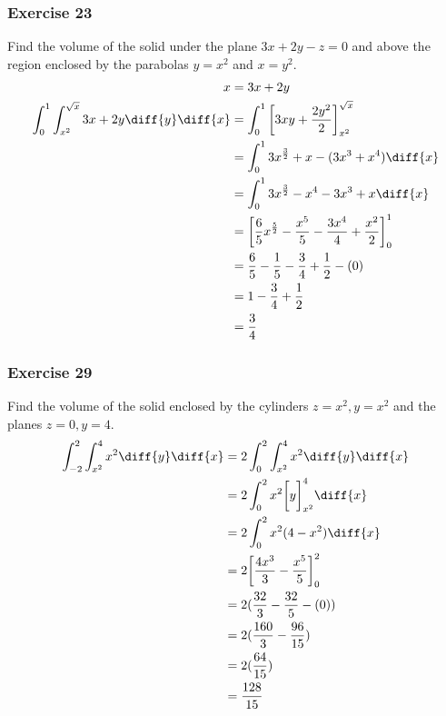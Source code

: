 \documentclass{math}
\begin{document}
\subsubsection*{Exercise 23}
Find the volume of the solid under the plane \( 3x+2y-z = 0 \) and above the
region enclosed by the parabolas \( y = x^2 \) and \( x = y^2 \).
\begin{align*}
  x &= 3x+2y \\
  \int_{0}^{1}\int_{x^2}^{\sqrt{x}}3x+2y\diff{y}\diff{x} &=
    \int_{0}^{1}\bigg[3xy+\frac{2y^2}{2}\bigg]_{x^2}^{\sqrt{x}} \\
  &= \int_{0}^{1}3x^{\frac{3}{2}}+x-(3x^3+x^4)\diff{x} \\
  &= \int_{0}^{1}3x^{\frac{3}{2}}-x^4-3x^3+x\diff{x} \\
  &= \bigg[
    \frac{6}{5}x^{\frac{5}{2}}-\frac{x^5}{5}-\frac{3x^4}{4}+\frac{x^2}{2}
    \bigg]_{0}^{1} \\
  &= \frac{6}{5}-\frac{1}{5}-\frac{3}{4}+\frac{1}{2}-(0) \\
  &= 1-\frac{3}{4}+\frac{1}{2} \\
  &= \frac{3}{4}
\end{align*}

\subsubsection*{Exercise 29}
Find the volume of the solid enclosed by the cylinders \( z = x^2, y = x^2 \)
and the planes \( z = 0, y = 4 \).
\begin{align*}
  \int_{-2}^{2}\int_{x^2}^{4}x^2\diff{y}\diff{x} &=
    2\int_{0}^{2}\int_{x^2}^{4}x^2\diff{y}\diff{x} \\
  &= 2\int_{0}^{2}x^2\bigg[y\bigg]_{x^2}^{4}\diff{x} \\
  &= 2\int_{0}^{2}x^2(4-x^2)\diff{x} \\
  &= 2\bigg[\frac{4x^3}{3}-\frac{x^5}{5}\bigg]_{0}^{2} \\
  &= 2(\frac{32}{3}-\frac{32}{5}-(0)) \\
  &= 2(\frac{160}{3}-\frac{96}{15}) \\
  &= 2(\frac{64}{15}) \\
  &= \frac{128}{15}
\end{align*}
\end{document}
